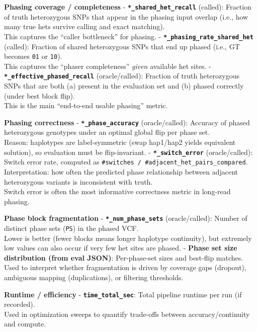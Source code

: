 \documentclass[
]{article}
\begin{document}
\textbf{Phasing coverage / completeness} -
\textbf{\texttt{*\_shared\_het\_recall}} (called): Fraction of truth
heterozygous SNPs that appear in the phasing input overlap (i.e., how
many true hets survive calling and exact matching).\\
This captures the ``caller bottleneck'' for phasing. -
\textbf{\texttt{*\_phasing\_rate\_shared\_het}} (called): Fraction of
shared heterozygous SNPs that end up phased (i.e., GT becomes
\texttt{0\textbar{}1} or \texttt{1\textbar{}0}).\\
This captures the ``phaser completeness'' \emph{given} available het
sites. - \textbf{\texttt{*\_effective\_phased\_recall}} (oracle/called):
Fraction of truth heterozygous SNPs that are both (a) present in the
evaluation set and (b) phased correctly (under best block flip).\\
This is the main ``end-to-end usable phasing'' metric.

\textbf{Phasing correctness} - \textbf{\texttt{*\_phase\_accuracy}}
(oracle/called): Accuracy of phased heterozygous genotypes under an
optimal global flip per phase set.\\
Reason: haplotypes are label-symmetric (swap hap1/hap2 yields equivalent
solution), so evaluation must be flip-invariant. -
\textbf{\texttt{*\_switch\_error}} (oracle/called): Switch error rate,
computed as \texttt{\#switches\ /\ \#adjacent\_het\_pairs\_compared}.\\
Interpretation: how often the predicted phase relationship between
adjacent heterozygous variants is inconsistent with truth.\\
Switch error is often the most informative correctness metric in
long-read phasing.

\textbf{Phase block fragmentation} -
\textbf{\texttt{*\_num\_phase\_sets}} (oracle/called): Number of
distinct phase sets (\texttt{PS}) in the phased VCF.\\
Lower is better (fewer blocks means longer haplotype continuity), but
extremely low values can also occur if very few het sites are phased. -
\textbf{Phase set size distribution (from eval JSON)}: Per-phase-set
sizes and best-flip matches.\\
Used to interpret whether fragmentation is driven by coverage gaps
(dropout), ambiguous mapping (duplications), or filtering thresholds.

\textbf{Runtime / efficiency} - \textbf{\texttt{time\_total\_sec}}:
Total pipeline runtime per run (if recorded).\\
Used in optimization sweeps to quantify trade-offs between
accuracy/continuity and compute.
\end{document}

